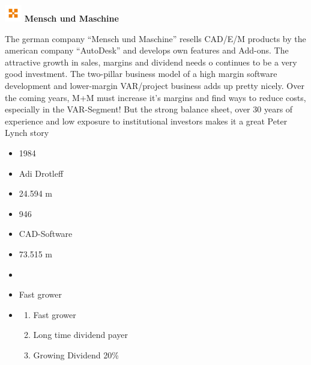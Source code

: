 \documentclass[11pt]{scrartcl}
\begin{document}



\begin{minipage}{\textwidth}
    \center\includegraphics[width=2em]{company_logo.png}
    {\textbf{Mensch und Maschine}}
\end{minipage}


\begin{minipage}[t]{0,75\textwidth}

    The german company \enquote{Mensch und Maschine} resells CAD/E/M
    products by the american company \enquote{AutoDesk} and develops
    own features and Add-ons. The attractive growth in sales, margins
    and dividend needs o continues to be a very good investment. The
    two-pillar business model of a high margin software development and
    lower-margin VAR/project business adds up pretty nicely. Over the
    coming years, M+M must increase it's margins and find ways to reduce
    costs, especially in the VAR-Segment! But the strong balance sheet,
    over 30 years of experience and low exposure to institutional investors
    makes it a great Peter Lynch story
\end{minipage}
\begin{minipage}[t]{0,25\textwidth}
    \begin{itemize}\scriptsize
        \item [\faAsterisk] 1984
        \item [\faMale] Adi Drotleff
        \item [\faEuro] \faEuro \num{24.594} m
        \item [\faUsers] \num{946}
        \item [\faIndustry] CAD-Software
        \item [\faBook] \faEuro \num{73,515} m
        \item [\reflectbox{\rotatebox[origin=c]{270}{\faLevelDown}}] \faEuro
        \item [\faFolderOpen]Fast grower
        \item [\faQuestion]
        \begin{enumerate}
            \item Fast grower
            \item Long time dividend payer
            \item Growing Dividend 20\%
        \end{enumerate}

    \end{itemize}
\end{minipage}
\end{document}
